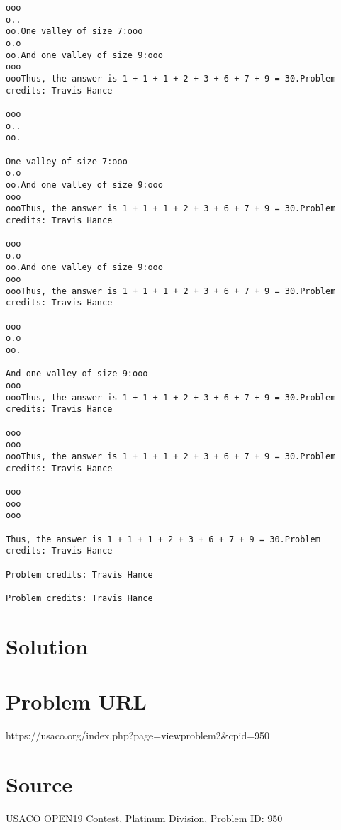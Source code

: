 \documentclass[12pt]{article}
\begin{document}
\begin{verbatim}
ooo
o..
oo.One valley of size 7:ooo
o.o
oo.And one valley of size 9:ooo
ooo
oooThus, the answer is 1 + 1 + 1 + 2 + 3 + 6 + 7 + 9 = 30.Problem credits: Travis Hance

ooo
o..
oo.

One valley of size 7:ooo
o.o
oo.And one valley of size 9:ooo
ooo
oooThus, the answer is 1 + 1 + 1 + 2 + 3 + 6 + 7 + 9 = 30.Problem credits: Travis Hance

ooo
o.o
oo.And one valley of size 9:ooo
ooo
oooThus, the answer is 1 + 1 + 1 + 2 + 3 + 6 + 7 + 9 = 30.Problem credits: Travis Hance

ooo
o.o
oo.

And one valley of size 9:ooo
ooo
oooThus, the answer is 1 + 1 + 1 + 2 + 3 + 6 + 7 + 9 = 30.Problem credits: Travis Hance

ooo
ooo
oooThus, the answer is 1 + 1 + 1 + 2 + 3 + 6 + 7 + 9 = 30.Problem credits: Travis Hance

ooo
ooo
ooo

Thus, the answer is 1 + 1 + 1 + 2 + 3 + 6 + 7 + 9 = 30.Problem credits: Travis Hance

Problem credits: Travis Hance

Problem credits: Travis Hance
\end{verbatim}

\section*{Solution}


\section*{Problem URL}
https://usaco.org/index.php?page=viewproblem2&cpid=950

\section*{Source}
USACO OPEN19 Contest, Platinum Division, Problem ID: 950
\end{document}
